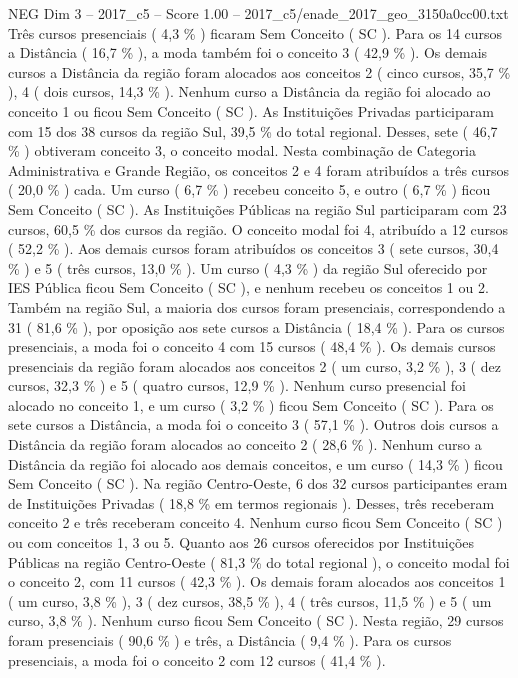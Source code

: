 \begin{textsample}{NEG Dim 3 – 2017\_c5 – Score 1.00 – 2017\_c5/enade\_2017\_geo\_3150a0cc00.txt}
Três cursos presenciais ( 4,3 \% ) ficaram Sem Conceito ( SC ).
Para os 14 cursos a Distância ( 16,7 \% ), a moda também foi o conceito 3 ( 42,9 \% ).
Os demais cursos a Distância da região foram alocados aos conceitos 2 ( cinco cursos, 35,7 \% ), 4 ( dois cursos, 14,3 \% ).
Nenhum curso a Distância da região foi alocado ao conceito 1 ou ficou Sem Conceito ( SC ).
As Instituições Privadas participaram com 15 dos 38 cursos da região Sul, 39,5 \% do total regional.
Desses, sete ( 46,7 \% ) obtiveram conceito 3, o conceito modal.
Nesta combinação de Categoria Administrativa e Grande Região, os conceitos 2 e 4 foram atribuídos a três cursos ( 20,0 \% ) cada.
Um curso ( 6,7 \% ) recebeu conceito 5, e outro ( 6,7 \% ) ficou Sem Conceito ( SC ).
As Instituições Públicas na região Sul participaram com 23 cursos, 60,5 \% dos cursos da região.
O conceito modal foi 4, atribuído a 12 cursos ( 52,2 \% ).
Aos demais cursos foram atribuídos os conceitos 3 ( sete cursos, 30,4 \% ) e 5 ( três cursos, 13,0 \% ).
Um curso ( 4,3 \% ) da região Sul oferecido por IES Pública ficou Sem Conceito ( SC ), e nenhum recebeu os conceitos 1 ou 2.
Também na região Sul, a maioria dos cursos foram presenciais, correspondendo a 31 ( 81,6 \% ), por oposição aos sete cursos a Distância ( 18,4 \% ).
Para os cursos presenciais, a moda foi o conceito 4 com 15 cursos ( 48,4 \% ).
Os demais cursos presenciais da região foram alocados aos conceitos 2 ( um curso, 3,2 \% ), 3 ( dez cursos, 32,3 \% ) e 5 ( quatro cursos, 12,9 \% ).
Nenhum curso presencial foi alocado no conceito 1, e um curso ( 3,2 \% ) ficou Sem Conceito ( SC ).
Para os sete cursos a Distância, a moda foi o conceito 3 ( 57,1 \% ).
Outros dois cursos a Distância da região foram alocados ao conceito 2 ( 28,6 \% ).
Nenhum curso a Distância da região foi alocado aos demais conceitos, e um curso ( 14,3 \% ) ficou Sem Conceito ( SC ).
Na região Centro-Oeste, 6 dos 32 cursos participantes eram de Instituições Privadas ( 18,8 \% em termos regionais ).
Desses, três receberam conceito 2 e três receberam conceito 4.
Nenhum curso ficou Sem Conceito ( SC ) ou com conceitos 1, 3 ou 5.
Quanto aos 26 cursos oferecidos por Instituições Públicas na região Centro-Oeste ( 81,3 \% do total regional ), o conceito modal foi o conceito 2, com 11 cursos ( 42,3 \% ).
Os demais foram alocados aos conceitos 1 ( um curso, 3,8 \% ), 3 ( dez cursos, 38,5 \% ), 4 ( três cursos, 11,5 \% ) e 5 ( um curso, 3,8 \% ).
Nenhum curso ficou Sem Conceito ( SC ).
Nesta região, 29 cursos foram presenciais ( 90,6 \% ) e três, a Distância ( 9,4 \% ).
Para os cursos presenciais, a moda foi o conceito 2 com 12 cursos ( 41,4 \% ).

\end{textsample}
